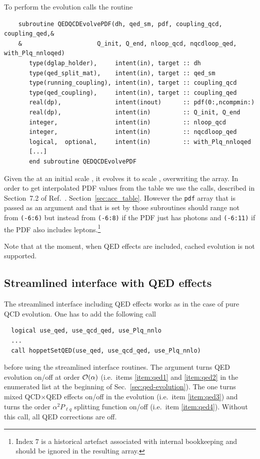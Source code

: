 To perform the evolution  calls the routine 
\begin{lstlisting}
    subroutine QEDQCDEvolvePDF(dh, qed_sm, pdf, coupling_qcd, coupling_qed,&
    &                     Q_init, Q_end, nloop_qcd, nqcdloop_qed, with_Plq_nnloqed)
       type(dglap_holder),     intent(in), target :: dh
       type(qed_split_mat),    intent(in), target :: qed_sm
       type(running_coupling), intent(in), target :: coupling_qcd
       type(qed_coupling),     intent(in), target :: coupling_qed
       real(dp),               intent(inout)      :: pdf(0:,ncompmin:)
       real(dp),               intent(in)         :: Q_init, Q_end
       integer,                intent(in)         :: nloop_qcd
       integer,                intent(in)         :: nqcdloop_qed
       logical,  optional,     intent(in)         :: with_Plq_nnloqed
       [...]
       end subroutine QEDQCDEvolvePDF
\end{lstlisting}
Given the  at an initial scale , it
evolves it to scale , overwriting the  array. 
%
In order to get interpolated PDF values from the table we use the
 calls, described in
\ifreleasenote
Section~7.2 of Ref.~\cite{Salam:2008qg}.
\else
Section~\ref{sec:acc_table}.
\fi
%
However the \texttt{pdf} array that is passed as an argument and that
is set by those subroutines should range not from \texttt{(-6:6)} but
instead from \texttt{(-6:8)} if the PDF just has photons and
\texttt{(-6:11)} if the PDF also includes leptons.\footnote{Index $7$
is a historical artefact associated with internal \hoppet bookkeeping
and should be ignored in the resulting  array.}

Note that at the moment, when QED effects are included, cached
evolution is not supported.


\subsection{Streamlined interface with QED effects}
The streamlined interface including QED effects works as in the case of pure QCD evolution.
One has to add the following call
\begin{lstlisting}
  logical use_qed, use_qcd_qed, use_Plq_nnlo
  ...
  call hoppetSetQED(use_qed, use_qcd_qed, use_Plq_nnlo)
\end{lstlisting}
before using the streamlined interface routines.
%
The  argument turns QED evolution on/off at order
${\cal O}(\alpha)$ (i.e.\ items \ref{item:qed1} and \ref{item:qed2} in
the enumerated list at the beginning of
Sec.~\ref{sec:qed-evolution}).
%
The  one turns
mixed QCD$\times$QED effects on/off in the evolution (i.e.\ item \ref{item:qed3}) and  turns 
the order $\alpha^2 P_{\ell q}$ splitting function on/off (i.e.\
item \ref{item:qed4}).
%
Without this call, all QED corrections
are off.

